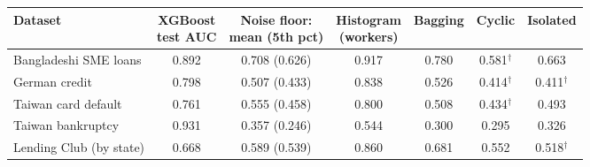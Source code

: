 \begin{tabular}{lcccccc}
\toprule
Dataset & \makecell{XGBoost\\test AUC} & \makecell{Noise floor:\\mean (5th pct)} & \makecell{Histogram\\(workers)} & Bagging & Cyclic & Isolated \\
\midrule
Bangladeshi SME loans & 0.892 & 0.708 (0.626) & 0.917 & 0.780 & 0.581$^\dagger$ & 0.663 \\
German credit & 0.798 & 0.507 (0.433) & 0.838 & 0.526 & 0.414$^\dagger$ & 0.411$^\dagger$ \\
Taiwan card default & 0.761 & 0.555 (0.458) & 0.800 & 0.508 & 0.434$^\dagger$ & 0.493 \\
Taiwan bankruptcy & 0.931 & 0.357 (0.246) & 0.544 & 0.300 & 0.295 & 0.326 \\
Lending Club (by state) & 0.668 & 0.589 (0.539) & 0.860 & 0.681 & 0.552 & 0.518$^\dagger$ \\
\bottomrule
\end{tabular}
